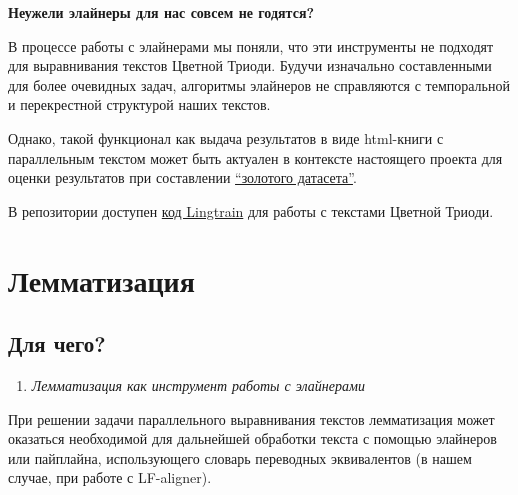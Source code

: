 \documentclass[
  letterpaper,
]{book}
\providecommand{\tightlist}{%
  \setlength{\itemsep}{0pt}\setlength{\parskip}{0pt}}\usepackage{longtable,booktabs,array}
\begin{document}
\begin{tcolorbox}[enhanced jigsaw, breakable, arc=.35mm, colframe=quarto-callout-note-color-frame, leftrule=.75mm, bottomrule=.15mm, rightrule=.15mm, toprule=.15mm, opacityback=0, left=2mm, colback=white]

\textbf{Неужели элайнеры для нас совсем не годятся?}\vspace{2mm}

В процессе работы с элайнерами мы поняли, что эти инструменты не
подходят для выравнивания текстов Цветной Триоди. Будучи изначально
составленными для более очевидных задач, алгоритмы элайнеров не
справляются с темпоральной и перекрестной структурой наших текстов.

Однако, такой функционал как выдача результатов в виде html-книги с
параллельным текстом может быть актуален в контексте настоящего проекта
для оценки результатов при составлении
\protect\hyperlink{sec-about_evluation}{``золотого датасета''}.

\end{tcolorbox}

В репозитории доступен
\href{https://github.com/Drozhzhinastya/GSPC/blob/main/scripts/aligners/Lingtrain_LABse.ipynb}{код
Lingtrain} для работы с текстами Цветной Триоди.


\hypertarget{ux43bux435ux43cux43cux430ux442ux438ux437ux430ux446ux438ux44f}{%
\chapter{Лемматизация}\label{ux43bux435ux43cux43cux430ux442ux438ux437ux430ux446ux438ux44f}}

\hypertarget{ux434ux43bux44f-ux447ux435ux433ux43e}{%
\section{Для чего?}\label{ux434ux43bux44f-ux447ux435ux433ux43e}}

\begin{enumerate}
\def\labelenumi{\arabic{enumi}.}
\tightlist
\item
  \emph{Лемматизация как инструмент работы с элайнерами}
\end{enumerate}

При решении задачи параллельного выравнивания текстов лемматизация может
оказаться необходимой для дальнейшей обработки текста с помощью
элайнеров или пайплайна, использующего словарь переводных эквивалентов
(в нашем случае, при работе с LF-aligner).
\end{document}
